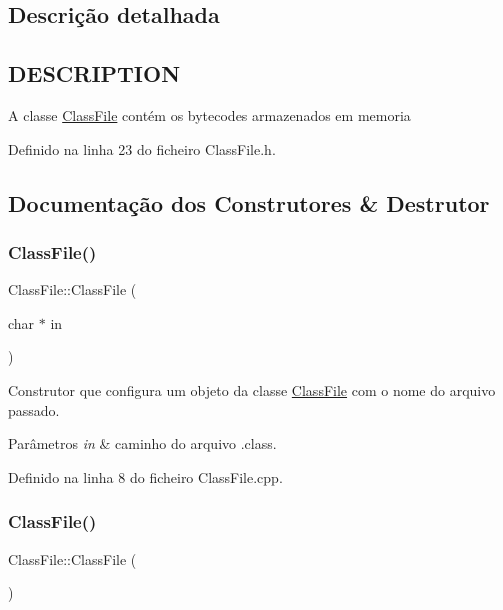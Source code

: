 \subsection{Descrição detalhada}
\hypertarget{classClassFile_DESCRIPTION}{}\subsection{D\+E\+S\+C\+R\+I\+P\+T\+I\+ON}\label{classClassFile_DESCRIPTION}
A classe \hyperlink{classClassFile}{Class\+File} contém os bytecodes armazenados em memoria 

Definido na linha 23 do ficheiro Class\+File.\+h.



\subsection{Documentação dos Construtores \& Destrutor}
\mbox{\label{classClassFile_a7cf76bcaf785b984e9d1b31d52a5aa7f}} 
\subsubsection{\texorpdfstring{Class\+File()}{ClassFile()}\hspace{0.1cm}{\footnotesize\ttfamily [1/2]}}
{\footnotesize\ttfamily Class\+File\+::\+Class\+File (\begin{DoxyParamCaption}\item[{char $\ast$}]{in }\end{DoxyParamCaption})}



Construtor que configura um objeto da classe \hyperlink{classClassFile}{Class\+File} com o nome do arquivo passado. 


\begin{DoxyParams}{Parâmetros}
{\em in} & caminho do arquivo .class. \\
\hline
\end{DoxyParams}


Definido na linha 8 do ficheiro Class\+File.\+cpp.

\mbox{\label{classClassFile_a47669d90346c9fa0db30ae582c74a199}} 
\subsubsection{\texorpdfstring{Class\+File()}{ClassFile()}\hspace{0.1cm}{\footnotesize\ttfamily [2/2]}}
{\footnotesize\ttfamily Class\+File\+::\+Class\+File (\begin{DoxyParamCaption}{ }\end{DoxyParamCaption})}



